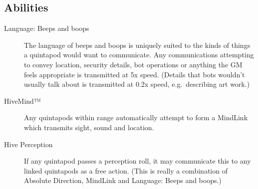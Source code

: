 


\subsection{Abilities}
\label{sec:abilities}

\begin{description}
\item[Language: Beeps and boops] The language of beeps and boops is uniquely
  suited to the kinds of things a quintapod would want to communicate. Any
  communications attempting to convey location, security details, bot operations
  or anything the GM feels appropriate is transmitted at 5x speed. (Details that
  bots wouldn't usually talk about is transmitted at 0.2x speed, e.g.~describing
  art work.)
\item[HiveMind™] Any quintapods within range automatically attempt to form a
  MindLink which transmits sight, sound and location.
\item[Hive Perception] If any quintapod passes a perception roll, it may
  communicate this to any linked quintapods as a free action. (This is really a
  combination of Absolute Direction, MindLink and Language: Beeps and boops.)
\end{description}

